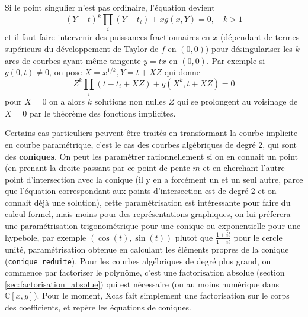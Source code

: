 \documentclass[a4paper,11pt]{book}
\begin{document}
\begin{giacjshere}
Si le point singulier n'est pas ordinaire, l'\'equation devient
$$ (Y-t)^k \prod_i (Y-t_i) + xg(x,Y)=0, \quad k>1$$
et il faut faire intervenir des puissances fractionnaires en $x$
(d\'ependant de termes sup\'erieurs du d\'eveloppement de Taylor
de $f$ en $(0,0)$)
pour d\'esingulariser les $k$ arcs de courbes ayant m\^eme tangente
$y=tx$ en $(0,0)$. Par exemple si $g(0,t) \neq 0$, 
on pose $X=x^{1/k}, Y=t+XZ$
qui donne 
$$ Z^k \prod_i (t-t_i+XZ) + g(X^k,t+XZ)=0$$
pour $X=0$ on a alors $k$ solutions non nulles $Z$ qui
se prolongent au voisinage de $X=0$ par le th\'eor\`eme des
fonctions implicites.

Certains cas particuliers peuvent \^etre trait\'es en
transformant la courbe implicite en courbe param\'etrique,
c'est le cas des courbes alg\'ebriques de degr\'e 2, qui
sont des {\bf coniques}. On peut les param\'etrer rationnellement
si on en connait un point (en prenant la droite passant par ce point
de pente $m$ et en cherchant l'autre point d'intersection
avec la conique (il y en a forc\'ement un et un seul autre,
parce que l'\'equation correspondant aux points
d'intersection est de degr\'e 2
et on connait d\'ej\`a une solution), cette param\'etrisation
est int\'eressante pour faire du calcul formel, mais moins
pour des repr\'esentations graphiques, on lui pr\'eferera
une param\'etrisation trigonom\'etrique pour une conique
ou exponentielle pour une hypebole, par exemple
$(\cos(t),\sin(t))$ plutot que $\frac{1+it}{1-it}$ pour
le cercle unit\'e, param\'etrisation obtenue en calculant
les \'el\'ements propres de la conique (\verb|conique_reduite|). 
Pour les courbes alg\'ebriques de degr\'e
plus grand, on commence par factoriser le polyn\^ome,
c'est une factorisation absolue (section \ref{sec:factorisation_absolue}) qui est n\'ecessaire (ou
au moins num\'erique dans $\mathbb{C}[x,y]$). Pour le moment,
Xcas fait simplement une factorisation sur le corps
des coefficients, et rep\`ere les \'equations de coniques.



\end{giacjshere}
\end{document}
